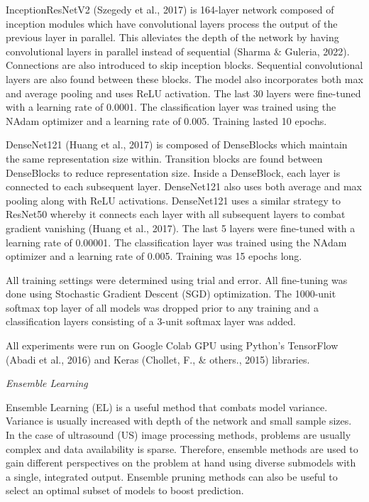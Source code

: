 \documentclass[
]{article}
\begin{document}
InceptionResNetV2 (Szegedy et al., 2017) is 164-layer network composed
of inception modules which have convolutional layers process the output
of the previous layer in parallel. This alleviates the depth of the
network by having convolutional layers in parallel instead of sequential
(Sharma \& Guleria, 2022). Connections are also introduced to skip
inception blocks. Sequential convolutional layers are also found between
these blocks. The model also incorporates both max and average pooling
and uses ReLU activation. The last 30 layers were fine-tuned with a
learning rate of 0.0001. The classification layer was trained using the
NAdam optimizer and a learning rate of 0.005. Training lasted 10 epochs.

DenseNet121 (Huang et al., 2017) is composed of DenseBlocks which
maintain the same representation size within. Transition blocks are
found between DenseBlocks to reduce representation size. Inside a
DenseBlock, each layer is connected to each subsequent layer.
DenseNet121 also uses both average and max pooling along with ReLU
activations. DenseNet121 uses a similar strategy to ResNet50 whereby it
connects each layer with all subsequent layers to combat gradient
vanishing (Huang et al., 2017). The last 5 layers were fine-tuned with a
learning rate of 0.00001. The classification layer was trained using the
NAdam optimizer and a learning rate of 0.005. Training was 15 epochs
long.

All training settings were determined using trial and error. All
fine-tuning was done using Stochastic Gradient Descent (SGD)
optimization. The 1000-unit softmax top layer of all models was dropped
prior to any training and a classification layers consisting of a 3-unit
softmax layer was added.

All experiments were run on Google Colab GPU using Python's TensorFlow
(Abadi et al., 2016) and Keras (Chollet, F., \& others., 2015)
libraries.

\emph{Ensemble Learning}

Ensemble Learning (EL) is a useful method that combats model variance.
Variance is usually increased with depth of the network and small sample
sizes. In the case of ultrasound (US) image processing methods, problems
are usually complex and data availability is sparse. Therefore, ensemble
methods are used to gain different perspectives on the problem at hand
using diverse submodels with a single, integrated output. Ensemble
pruning methods can also be useful to select an optimal subset of models
to boost prediction.
\end{document}
